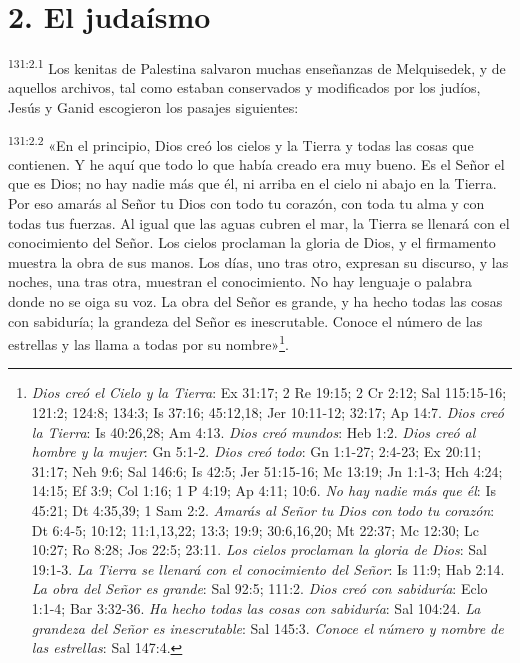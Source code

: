 \section*{2. El judaísmo}
\par
\textsuperscript{131:2.1} Los kenitas de Palestina salvaron muchas enseñanzas de Melquisedek, y de aquellos archivos, tal como estaban conservados y modificados por los judíos, Jesús y Ganid escogieron los pasajes siguientes:

\par
\textsuperscript{131:2.2} «En el principio, Dios creó los cielos y la Tierra y todas las cosas que contienen. Y he aquí que todo lo que había creado era muy bueno. Es el Señor el que es Dios; no hay nadie más que él, ni arriba en el cielo ni abajo en la Tierra. Por eso amarás al Señor tu Dios con todo tu corazón, con toda tu alma y con todas tus fuerzas. Al igual que las aguas cubren el mar, la Tierra se llenará con el conocimiento del Señor. Los cielos proclaman la gloria de Dios, y el firmamento muestra la obra de sus manos. Los días, uno tras otro, expresan su discurso, y las noches, una tras otra, muestran el conocimiento. No hay lenguaje o palabra donde no se oiga su voz. La obra del Señor es grande, y ha hecho todas las cosas con sabiduría; la grandeza del Señor es inescrutable. Conoce el número de las estrellas y las llama a todas por su nombre»\footnote{\textit{Dios creó el Cielo y la Tierra}: Ex 31:17; 2 Re 19:15; 2 Cr 2:12; Sal 115:15-16; 121:2; 124:8; 134:3; Is 37:16; 45:12,18; Jer 10:11-12; 32:17; Ap 14:7. \textit{Dios creó la Tierra}: Is 40:26,28; Am 4:13. \textit{Dios creó mundos}: Heb 1:2. \textit{Dios creó al hombre y la mujer}: Gn 5:1-2. \textit{Dios creó todo}: Gn 1:1-27; 2:4-23; Ex 20:11; 31:17; Neh 9:6; Sal 146:6; Is 42:5; Jer 51:15-16; Mc 13:19; Jn 1:1-3; Hch 4:24; 14:15; Ef 3:9; Col 1:16; 1 P 4:19; Ap 4:11; 10:6. \textit{No hay nadie más que él}: Is 45:21; Dt 4:35,39; 1 Sam 2:2. \textit{Amarás al Señor tu Dios con todo tu corazón}: Dt 6:4-5; 10:12; 11:1,13,22; 13:3; 19:9; 30:6,16,20; Mt 22:37; Mc 12:30; Lc 10:27; Ro 8:28; Jos 22:5; 23:11. \textit{Los cielos proclaman la gloria de Dios}: Sal 19:1-3. \textit{La Tierra se llenará con el conocimiento del Señor}: Is 11:9; Hab 2:14. \textit{La obra del Señor es grande}: Sal 92:5; 111:2. \textit{Dios creó con sabiduría}: Eclo 1:1-4; Bar 3:32-36. \textit{Ha hecho todas las cosas con sabiduría}: Sal 104:24. \textit{La grandeza del Señor es inescrutable}: Sal 145:3. \textit{Conoce el número y nombre de las estrellas}: Sal 147:4.}.

